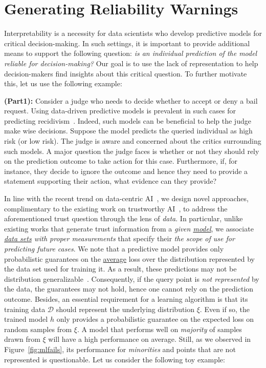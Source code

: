 \documentclass[11pt]{article}
\newcommand{\dee}{\mathcal{D}}
\newcommand{\dist}{\xi}
\begin{document}
\section{Generating Reliability Warnings}\label{sec:reliability}
Interpretability is a necessity for data scientists who develop predictive models for critical decision-making.
In such settings, it is important to provide additional means to support the following question:
{\it is an individual prediction of the model reliable for decision-making?} Our goal is to use the lack of representation to help decision-makers find insights about this critical question.
To further motivate this, let us use the following example:

\vspace{1mm}
\begin{example}\label{ex-0}
{\bf(Part1):} Consider a judge who needs to decide whether to accept or deny a bail request. Using data-driven predictive models is prevalent in such cases for predicting recidivism~\cite{dressel2018accuracy}.
Indeed, such models can be beneficial to help the judge make wise decisions.
Suppose the model predicts the queried individual as high risk (or low risk).
The judge is aware and concerned about the critics surrounding such models.
A major question the judge faces is whether or not they should rely on the prediction outcome to take action for this case.
Furthermore, if, for instance, they decide to ignore the outcome and hence they need to provide a statement supporting their action, what evidence can they provide? 
\end{example}

In line with the recent trend on data-centric AI~\cite{ng2021mlops}, we design {novel approaches}, {complimentary} to the existing work on trustworthy AI~\cite{wing2021trustworthy,kentour2021analysis,liu2021trustworthy,singh2021trustworthy}, to address the aforementioned trust question through the lens of {\it data}.
In particular, unlike existing works that generate trust information from a {\it given \underline{model}}, we associate {\it \underline{data sets} with proper measurements} that specify their {\it the scope of use for predicting future cases}.
We note that a predictive model provides only probabilistic guarantees on the \underline{average} loss over the distribution represented by the data set used for training it.
As a result, these predictions may not be distribution generalizable~\cite{kulynych2022you}.
Consequently, if the query point is {\it not represented} by the data, the guarantees may not hold, hence one cannot rely on the prediction outcome.
Besides, an essential requirement for a learning algorithm is that its training data $\dee$ should represent the underlying distribution $\dist$.
Even if so, the trained model $h$ only provides a probabilistic guarantee on the {expected} loss on random samples from $\dist$.  
A model that performs well on {\it majority} of samples drawn from $\dist$ will have a high performance on average. Still, as we observed in Figure~\ref{fig:mlfails},
its performance for {\it minorities} and points that are not represented is questionable. Let us consider the following toy example:
\end{document}
